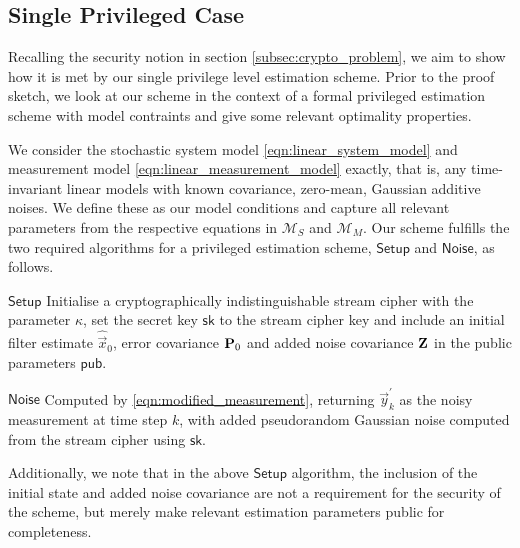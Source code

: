 \documentclass[letterpaper, 10 pt, conference]{ieeeconf}
\begin{document}
\subsection{Single Privileged Case}
Recalling the security notion in section \ref{subsec:crypto_problem}, we aim to show how it is met by our single privilege level estimation scheme. Prior to the proof sketch, we look at our scheme in the context of a formal privileged estimation scheme with model contraints and give some relevant optimality properties.

We consider the stochastic system model \eqref{eqn:linear_system_model} and measurement model \eqref{eqn:linear_measurement_model} exactly, that is, any time-invariant linear models with known covariance, zero-mean, Gaussian additive noises. We define these as our model conditions and capture all relevant parameters from the respective equations in $\mathcal{M}_S$ and $\mathcal{M}_M$. Our scheme fulfills the two required algorithms for a privileged estimation scheme, $\mathsf{Setup}$ and $\mathsf{Noise}$, as follows.
\begin{LaTeXdescription}
   \item[$\mathsf{Setup}$] Initialise a cryptographically indistinguishable stream cipher with the parameter $\kappa$, set the secret key $\mathsf{sk}$ to the stream cipher key and include an initial filter estimate $\hat{\vec{x}}_0$, error covariance ${{\mathbf{P}}}_0$ and added noise covariance ${{\mathbf{Z}}}$ in the public parameters $\mathsf{pub}$.
   \item[$\mathsf{Noise}$] Computed by \eqref{eqn:modified_measurement}, returning $\vec{y}^\prime_k$ as the noisy measurement at time step $k$, with added pseudorandom Gaussian noise computed from the stream cipher using $\mathsf{sk}$.
\end{LaTeXdescription}
Additionally, we note that in the above $\mathsf{Setup}$ algorithm, the inclusion of the initial state and added noise covariance are not a requirement for the security of the scheme, but merely make relevant estimation parameters public for completeness.
\end{document}
